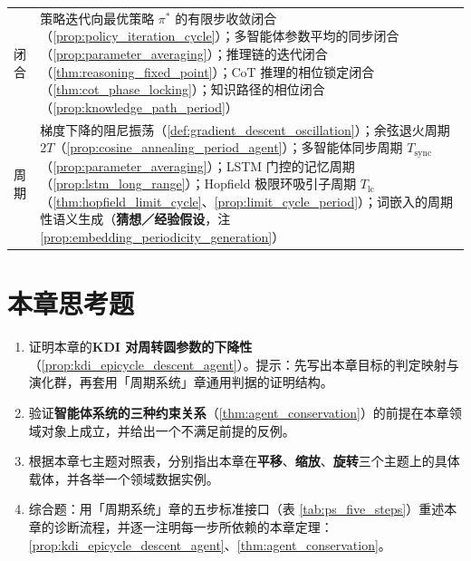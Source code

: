 \begin{center}
\begin{tabular}{>{\centering\arraybackslash}p{2.2cm}>{\centering\arraybackslash}p{10.5cm}}
闭合 & 策略迭代向最优策略 $\pi^*$ 的有限步收敛闭合（\cref{prop:policy_iteration_cycle}）；多智能体参数平均的同步闭合（\cref{prop:parameter_averaging}）；推理链的迭代闭合（\cref{thm:reasoning_fixed_point}）；CoT 推理的相位锁定闭合（\cref{thm:cot_phase_locking}）；知识路径的相位闭合（\cref{prop:knowledge_path_period}） \\
周期 & 梯度下降的阻尼振荡（\cref{def:gradient_descent_oscillation}）；余弦退火周期 $2T$（\cref{prop:cosine_annealing_period_agent}）；多智能体同步周期 $T_{\text{sync}}$（\cref{prop:parameter_averaging}）；LSTM 门控的记忆周期（\cref{prop:lstm_long_range}）；Hopfield 极限环吸引子周期 $T_{\text{lc}}$（\cref{thm:hopfield_limit_cycle}、\cref{prop:limit_cycle_period}）；词嵌入的周期性语义生成（\textbf{猜想／经验假设}，注 \cref{prop:embedding_periodicity_generation}） \\
\bottomrule
\end{tabular}
\end{center}

\section*{本章思考题}

\begin{enumerate}[leftmargin=3em, label=\textbf{题 \arabic*}]
    \item 证明本章的\textbf{KDI 对周转圆参数的下降性}（\ref{prop:kdi_epicycle_descent_agent}）。提示：先写出本章目标的判定映射与演化群，再套用「周期系统」章通用判据的证明结构。

    \item 验证\textbf{智能体系统的三种约束关系}（\ref{thm:agent_conservation}）的前提在本章领域对象上成立，并给出一个不满足前提的反例。

    \item 根据本章七主题对照表，分别指出本章在\textbf{平移}、\textbf{缩放}、\textbf{旋转}三个主题上的具体载体，并各举一个领域数据实例。

    \item 综合题：用「周期系统」章的五步标准接口（表 \ref{tab:ps_five_steps}）重述本章的诊断流程，并逐一注明每一步所依赖的本章定理：\ref{prop:kdi_epicycle_descent_agent}、\ref{thm:agent_conservation}。
\end{enumerate}


